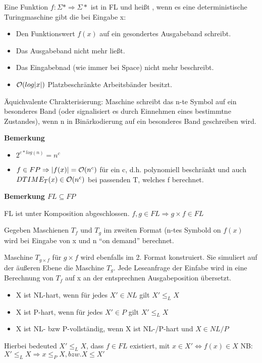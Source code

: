 Eine Funktion $f: \Sigma* \Rightarrow \Sigma*$ ist in FL und
heißt , wenn es eine
deterministische Turingmaschine gibt die bei Eingabe x:

\begin{itemize}
\item Den Funktionswert $f(x)$ auf ein gesondertes Ausgabeband schreibt.
\item Das Ausgabeband nicht mehr ließt.
\item Das Eingabebnad (wie immer
bei Space) nicht mehr beschreibt.
\item $\mathcal{O}(log|x|)$ Platzbeschränkte Arbeitsbänder besitzt.
\end{itemize}

Äquichvalente Chrakterisierung: Maschine schreibt das n-te Symbol auf
ein besonderes Band (oder signalisiert es durch Einnehmen eines
bestimmtne Zustandes), wenn n in Binärkodierung auf ein besonderes
Band geschreiben wird.

\textbf{Bemerkung}
\begin{itemize}
\item $2^{c*log(n)}=n^c$
\item $f \in FP \Rightarrow |f(x)| = \mathcal{O}(n^c)$
für ein c, d.h. polynomiell beschränkt und auch $DTIME_T(x) \in \mathcal{O}(n^c)$
bei passenden T, welches f berechnet.
\end{itemize}

\textbf{Bemerkung $FL \subseteq FP$}
\begin{satz}
FL ist unter Komposition abgeschlossen.
$f,g \in FL \Rightarrow g \times f \in FL$
\end{satz}

Gegeben Maschienen $T_f$ und $T_g$ im zweiten Format (n-tes Symbold on
$f(x)$ wird bei Eingabe von x und n ``on demand'' berechnet.

Maschine $T_{g \times f}$ für $g \times f $ wird ebenfalls im
2. Format konstruiert. Sie simuliert auf der äußeren Ebene die
Maschine $T_g$.  Jede Leseanfrage der Einfabe wird in eine Berechnung
von $T_f$ auf x an der entsprechnen Ausgabeposition übersetzt.

\begin{itemize}
\item X ist NL-hart, wenn für jedes $X'\in NL$ gilt $X' \leq_L X$
\item X ist P-hart, wenn für jedes $X'\in P$ gilt $X' \leq_L X$
\item X ist NL- bzw P-vollständig, wenn X ist NL-/P-hart und $X\in NL/P$
\end{itemize}
Hierbei bedeuted $X' \leq_L X$, dass $f\in FL$ existiert, mit $x \in X' \Leftrightarrow f(x) \in X$
NB: $X' \leq_L X \Rightarrow x\leq_P X, bzw. X\leq X'$

